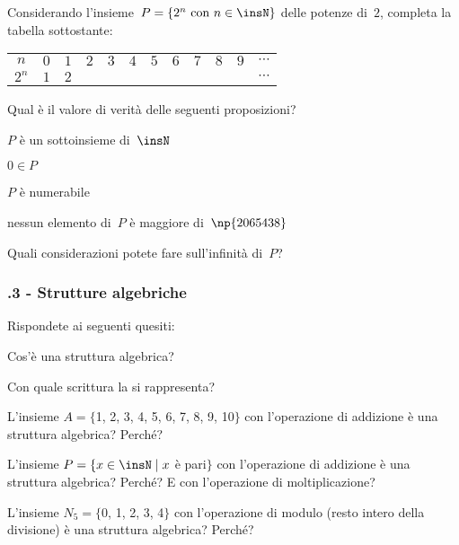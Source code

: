 \begin{esercizio}
\label{ese:E.16}

Considerando l'insieme~$P=\left\{2^{n}\text{ con }n\in \insN\right\}$ delle potenze di~$2$,
completa la tabella sottostante:
\begin{center}
 \begin{tabular}{cccccccccccc}
  \toprule
  $n$ & $0$ & $1$ & $2$ & $3$ & $4$ & $5$ & $6$ & $7$ & $8$ & $9$ & $\cdots$\\
  $2^n$ & $1$ & $2$ & & & & & & & & & $\cdots$ \\
  \bottomrule
 \end{tabular}
\end{center}

Qual è il valore di verità delle seguenti proposizioni?
\begin{enumeratea}
\TabPositions{8cm}
\item $P$ è un sottoinsieme di~$\insN$ \tab\boxV\quad\boxF
\item $0 \in P$ \tab\boxV\quad\boxF
\item $P$ è numerabile \tab\boxV\quad\boxF
\item nessun elemento di~$P$ è maggiore di~$\np{2065438}$\tab\boxV\quad\boxF
\end{enumeratea}

Quali considerazioni potete fare sull'infinità di~$P$?
\end{esercizio}

\subsubsection*{\thechapter.3 - Strutture algebriche}

\begin{esercizio}
\label{ese:E.17}
Rispondete ai seguenti quesiti:
\begin{enumeratea}
\item Cos'è una struttura algebrica?
\item Con quale scrittura la si rappresenta?
\item L'insieme $A=\{$1, 2, 3, 4, 5, 6, 7, 8, 9, 10$\}$ con l'operazione di addizione è una struttura algebrica? Perché?
\item L'insieme $P=\{x\in\insN\mid x$ è pari$\}$ con l'operazione di addizione è una struttura algebrica? Perché? E con l'operazione di moltiplicazione?
\item L'insieme $N_5=\{$0, 1, 2, 3, 4$\}$ con l'operazione di modulo (resto intero della divisione) è una struttura algebrica? Perché?
\end{enumeratea}
\end{esercizio}


